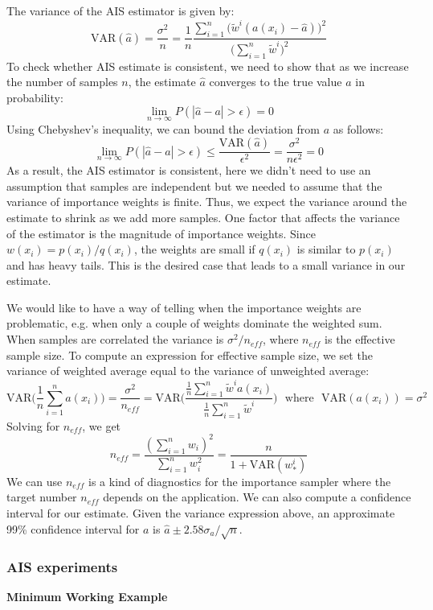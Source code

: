 The variance of the AIS estimator is given by:
\begin{equation}
    \mathrm{VAR}(\hat{a}) = \frac{\sigma^2}{n} = \frac{1}{n}\frac{\sum_{i=1}^{n}\bigg(\tilde{w}^{i}(a(x_i) - \hat{a}) \bigg)^{2}}{\bigg(\sum_{i=1}^{n}\tilde{w}^{i}\bigg)^{2}}
\end{equation}
To check whether AIS estimate is consistent, we need to show that as we increase the number of samples $n$, the estimate $\hat{a}$ converges to the true value $a$ in probability:
\begin{equation}
    \lim_{n\rightarrow \infty} P(|\hat{a} - a| > \epsilon) = 0
\end{equation}
Using Chebyshev's inequality, we can bound the deviation from $a$ as follows:
\begin{equation}
    \lim_{n\rightarrow \infty} P(|\hat{a} - a| > \epsilon) \leq \frac{\mathrm{VAR}(\hat{a})}{\epsilon^2} = \frac{\sigma^2}{n \epsilon^2} = 0
\end{equation}
As a result, the AIS estimator is consistent, here we didn't need to use an assumption that samples are independent but we needed to assume that the variance of importance weights is finite. Thus, we expect the variance around the estimate to shrink as we add more samples. One factor that affects the variance of the estimator is the magnitude of importance weights. Since $w(x_i) = p(x_i)/q(x_i)$, the weights are small if $q(x_i)$ is similar to $p(x_i)$ and has heavy tails. This is the desired case that leads to a small variance in our estimate. 

We would like to have a way of telling when the importance weights are problematic, e.g. when only a couple of weights dominate the weighted sum. When samples are correlated the variance is $\sigma^2 / n_{eff}$, where $n_{eff}$ is the effective sample size. To compute an expression for effective sample size, we set the variance of weighted average equal to the variance of unweighted average:
\begin{equation}
    \mathrm{VAR}\bigg(\frac{1}{n}\sum_{i=1}^{n}a(x_i)\bigg) = \frac{\sigma^2}{n_{eff}} = \mathrm{VAR}\bigg(\frac{\frac{1}{n}\sum_{i=1}^{n}\tilde{w}^ia(x_i)}{\frac{1}{n}\sum_{i=1}^{n}\tilde{w}^{i}}\bigg)~~~\mathrm{where}~~~\mathrm{VAR}(a(x_i)) = \sigma^2
\end{equation}
Solving for $n_{eff}$, we get
\begin{equation}
    n_{eff} = \frac{(\sum_{i=1}^{n}w_i)^2}{\sum_{i=1}^{n}w_{i}^{2}} = \frac{n}{1 + \mathrm{VAR}(w_{\ast}^{i})} 
\end{equation}
We can use $n_{eff}$ is a kind of diagnostics for the importance sampler where the target number $n_{eff}$ depends on the application. We can also compute a confidence interval for our estimate. Given the variance expression above, an approximate 99\% confidence interval for $a$ is $\hat{a} \pm 2.58 \sigma_a / \sqrt{n}$.\\

\subsubsection{AIS experiments}

\textbf{Minimum Working Example}





